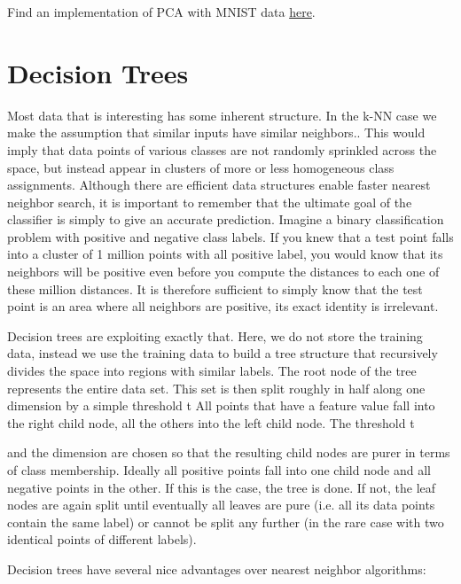 \documentclass[12pt]{article}
\begin{document}
 
 Find an implementation of PCA with MNIST data \href{https://github.com/aswin16/ML-REPORT/blob/master/codes/PCA.ipynb}{here}.
 
 \section{Decision Trees}
 
  Most data that is interesting has some inherent structure. In the k-NN case we make the assumption that similar inputs have similar neighbors.. This would imply that data points of various classes are not randomly sprinkled across the space, but instead appear in clusters of more or less homogeneous class assignments. Although there are efficient data structures enable faster nearest neighbor search, it is important to remember that the ultimate goal of the classifier is simply to give an accurate prediction. Imagine a binary classification problem with positive and negative class labels. If you knew that a test point falls into a cluster of 1 million points with all positive label, you would know that its neighbors will be positive even before you compute the distances to each one of these million distances. It is therefore sufficient to simply know that the test point is an area where all neighbors are positive, its exact identity is irrelevant.
 
 Decision trees are exploiting exactly that. Here, we do not store the training data, instead we use the training data to build a tree structure that recursively divides the space into regions with similar labels. The root node of the tree represents the entire data set. This set is then split roughly in half along one dimension by a simple threshold t
  All points that have a feature value  fall into the right child node, all the others into the left child node. The threshold t
 
 and the dimension are chosen so that the resulting child nodes are purer in terms of class membership. Ideally all positive points fall into one child node and all negative points in the other. If this is the case, the tree is done. If not, the leaf nodes are again split until eventually all leaves are pure (i.e. all its data points contain the same label) or cannot be split any further (in the rare case with two identical points of different labels).
 
 Decision trees have several nice advantages over nearest neighbor algorithms:
 
\end{document}
